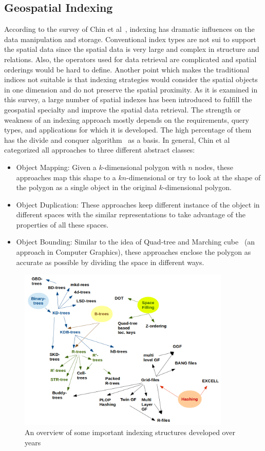 \documentclass[a4paper,12pt]{article}
\begin{document}
\subsection{Geospatial Indexing}
\label{s.geospatial-index}
According to the survey of Chin et al~\cite{survey}, indexing has dramatic influences on the data manipulation and storage. Conventional index types are not sui to support the spatial data since the spatial data is very large and complex in structure and relations. Also, the operators used for data retrieval are complicated and spatial orderings would be hard to define. Another point which makes the traditional indices not suitable is that indexing strategies would consider the spatial objects in one dimension and do not preserve the spatial proximity.
As it is examined in this survey, a large number of spatial indexes has been introduced to fulfill the geospatial specialty and improve the spatial data retrieval. The strength or weakness of an indexing approach mostly depends on the requirements, query types, and applications for which it is developed. 
The high percentage of them has the divide and conquer algorithm~\cite{divconquer} as a basis. 
In general, Chin et al~\cite{survey} categorized all approaches to three different abstract classes:
\begin{itemize}
\item Object Mapping: Given a $k$-dimensional polygon with $n$ nodes, these approaches map this shape to a $kn$-dimensional or try to look at the shape of the polygon as a single object in the original $k$-dimensional polygon.   
\item Object Duplication: These approaches keep different instance of the object in different spaces with the similar representations to take advantage of the properties of all these spaces. 
\item Object Bounding: Similar to the idea of Quad-tree and Marching cube~\cite{marchingcube} (an approach in Computer Graphics), 
these approaches enclose the polygon as accurate as possible by dividing the space in different ways. 
\end{itemize}

\begin{figure}
\centering
\includegraphics[width=0.9\textwidth]{Trees}
\caption{An overview of some important indexing structures developed over years}
\label{trees}
\end{figure}
\end{document}
